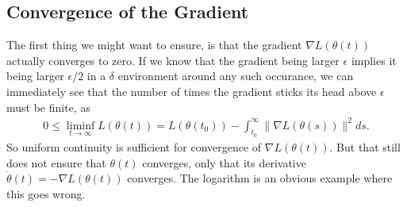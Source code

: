 \subsection{Convergence of the Gradient}

The first thing we might want to ensure, is that the gradient \(\nabla L(\theta(t))\)
actually converges to zero. If we know that the gradient being larger \(\epsilon\)
implies it being larger \(\epsilon/2\) in a \(\delta\) environment around any
such occurance, we can immediately see that the number of times the gradient
sticks its head above \(\epsilon\) must be finite, as
%
\begin{align}\label{bounded gradient integral}
	0 \le \liminf_{t\to\infty} L(\theta(t))
	=  L(\theta(t_0)) - \int_{t_0}^\infty \|\nabla L(\theta(s))\|^2 ds.
\end{align}
%
So uniform continuity is sufficient for convergence of \(\nabla L(\theta(t))\).
But that still does not ensure that \(\theta(t)\) converges, only that its
derivative \(\dot{\theta}(t) = -\nabla L(\theta(t))\) converges. The logarithm
is an obvious example where this goes wrong.

